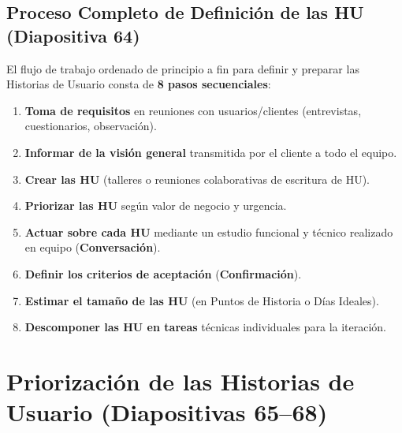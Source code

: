 \begin{center}
{%
}
\end{center}

\subsection{Proceso Completo de Definición de las HU (Diapositiva 64)}

El flujo de trabajo ordenado de principio a fin para definir y preparar las Historias de Usuario consta de \textbf{8 pasos secuenciales}:
\begin{enumerate}[label=\textbf{Paso \arabic*:}, leftmargin=2.2cm, itemsep=2pt]
    \item \textbf{Toma de requisitos} en reuniones con usuarios/clientes (entrevistas, cuestionarios, observación).
    \item \textbf{Informar de la visión general} transmitida por el cliente a todo el equipo.
    \item \textbf{Crear las HU} (talleres o reuniones colaborativas de escritura de HU).
    \item \textbf{Priorizar las HU} según valor de negocio y urgencia.
    \item \textbf{Actuar sobre cada HU} mediante un estudio funcional y técnico realizado en equipo (\textbf{Conversación}).
    \item \textbf{Definir los criterios de aceptación} (\textbf{Confirmación}).
    \item \textbf{Estimar el tamaño de las HU} (en Puntos de Historia o Días Ideales).
    \item \textbf{Descomponer las HU en tareas} técnicas individuales para la iteración.
\end{enumerate}

\section{Priorización de las Historias de Usuario (Diapositivas 65--68)}

